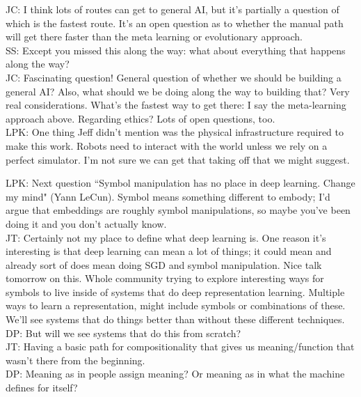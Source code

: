 JC: I think lots of routes can get to general AI, but it's partially a question of which is the fastest route. It's an open question as to whether the manual path will get there faster than the meta learning or evolutionary approach. \\

SS: Except you missed this along the way: what about everything that happens along the way? \\

JC: Fascinating question! General question of whether we should be building a general AI? Also, what should we be doing along the way to building that? Very real considerations. What's the fastest way to get there: I say the meta-learning approach above. Regarding ethics? Lots of open questions, too. \\

LPK: One thing Jeff didn't mention was the physical infrastructure required to make this work. Robots need to interact with the world unless we rely on a perfect simulator. I'm not sure we can get that taking off that we might suggest.

\spacerule

LPK: Next question ``Symbol manipulation has no place in deep learning. Change my mind" (Yann LeCun). Symbol means something different to embody; I'd argue that embeddings are roughly symbol manipulations, so maybe you've been doing it and you don't actually know. \\

JT: Certainly not my place to define what deep learning is. One reason it's interesting is that deep learning can mean a lot of things; it could mean and already sort of does mean doing SGD and symbol manipulation. Nice talk tomorrow on this. Whole community trying to explore interesting ways for symbols to live inside of systems that do deep representation learning. Multiple ways to learn a representation, might include symbols or combinations of these. We'll see systems that do things better than without these different techniques. \\

DP: But will we see systems that do this from scratch? \\

JT: Having a basic path for compositionality that gives us meaning/function that wasn't there from the beginning. \\

DP: Meaning as in people assign meaning? Or meaning as in what the machine defines for itself? \\

